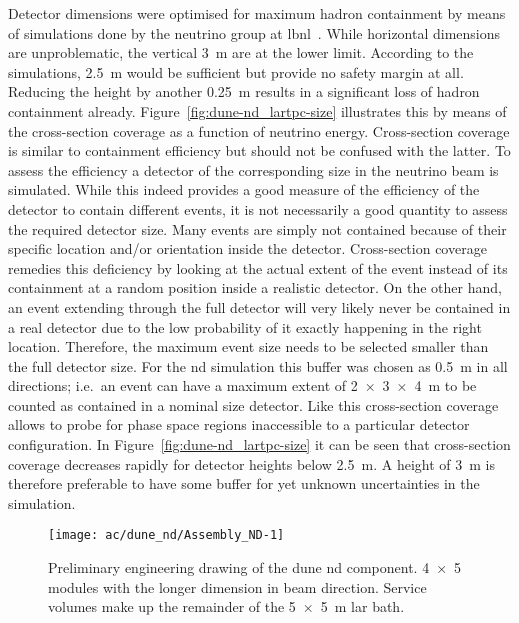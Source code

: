 Detector dimensions were optimised for maximum hadron containment by means of simulations done by the neutrino group at \gls{lbnl}~\cite{lartpcSizeChris}.
While horizontal dimensions are unproblematic, the vertical \SI{3}{\metre} are at the lower limit.
According to the simulations, \SI{2.5}{\metre} would be sufficient but provide no safety margin at all.
Reducing the height by another \SI{0.25}{\metre} results in a significant loss of hadron containment already.
Figure~\ref{fig:dune-nd_lartpc-size} illustrates this by means of the cross-section coverage as a function of neutrino energy.
Cross-section coverage is similar to containment efficiency but should not be confused with the latter.
To assess the efficiency a detector of the corresponding size in the neutrino beam is simulated.
While this indeed provides a good measure of the efficiency of the detector to contain different events, it is not necessarily a good quantity to assess the required detector size.
Many events are simply not contained because of their specific location and/or orientation inside the detector.
Cross-section coverage remedies this deficiency by looking at the actual extent of the event instead of its containment at a random position inside a realistic detector.
On the other hand, an event extending through the full detector will very likely never be contained in a real detector due to the low probability of it exactly happening in the right location.
Therefore, the maximum event size needs to be selected smaller than the full detector size.
For the \gls{nd} simulation this buffer was chosen as \SI{0.5}{\metre} in all directions; i.e.\ an event can have a maximum extent of \SI{2 x 3 x 4}{\metre} to be counted as contained in a nominal size detector.
Like this cross-section coverage allows to probe for phase space regions inaccessible to a particular detector configuration.
In Figure~\ref{fig:dune-nd_lartpc-size} it can be seen that cross-section coverage decreases rapidly for detector heights below \SI{2.5}{\metre}.
A height of \SI{3}{\metre} is therefore preferable to have some buffer for yet unknown uncertainties in the simulation.

\begin{figure}[tbp]
	\centering
	\texttt{[image: ac/dune\_nd/Assembly\_ND-1]}
	\caption[\AC{}   engineering drawing]{%
		Preliminary engineering drawing of the \acrshort{dune} \acrshort{nd} \AC{} component.
		\num{4 x 5} modules with the longer dimension in beam direction.
		Service volumes make up the remainder of the \SI{5 x 5}{\metre} \acrshort{lar} bath.
	}
	\label{fig:dune-nd_ac}
\end{figure}

